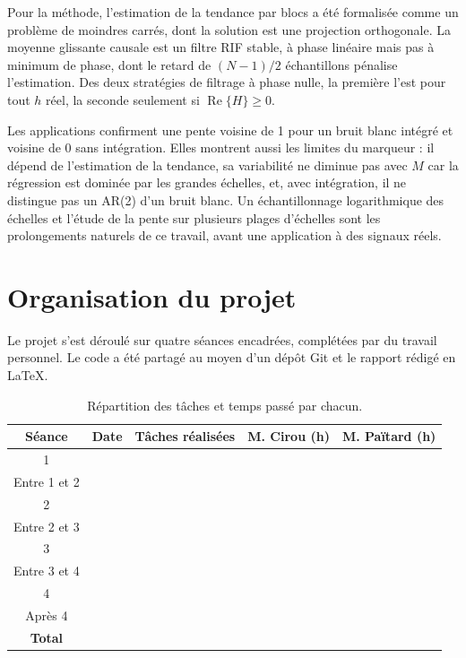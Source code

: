 \documentclass[11pt,a4paper]{article}
\begin{document}
Pour la méthode, l'estimation de la tendance par blocs a été formalisée comme un problème de moindres carrés, dont la solution est une projection orthogonale. La moyenne glissante causale est un filtre RIF stable, à phase linéaire mais pas à minimum de phase, dont le retard de $(N-1)/2$ échantillons pénalise l'estimation. Des deux stratégies de filtrage à phase nulle, la première l'est pour tout $h$ réel, la seconde seulement si $\operatorname{Re}\{H\} \geq 0$.

Les applications confirment une pente voisine de 1 pour un bruit blanc intégré et voisine de 0 sans intégration. Elles montrent aussi les limites du marqueur : il dépend de l'estimation de la tendance, sa variabilité ne diminue pas avec $M$ car la régression est dominée par les grandes échelles, et, avec intégration, il ne distingue pas un AR(2) d'un bruit blanc. Un échantillonnage logarithmique des échelles et l'étude de la pente sur plusieurs plages d'échelles sont les prolongements naturels de ce travail, avant une application à des signaux réels.

\section{Organisation du projet}

Le projet s'est déroulé sur quatre séances encadrées, complétées par du travail personnel. Le code a été partagé au moyen d'un dépôt Git et le rapport rédigé en \LaTeX.

\begin{table}[ht]
  \centering
  \renewcommand{\arraystretch}{1.6}
  \begin{tabular}{|c|c|p{6.2cm}|c|c|}
    \hline
    Séance & Date & Tâches réalisées & M. Cirou (h) & M. Païtard (h) \\
    \hline
    1 & & & & \\
    \hline
    Entre 1 et 2 & & & & \\
    \hline
    2 & & & & \\
    \hline
    Entre 2 et 3 & & & & \\
    \hline
    3 & & & & \\
    \hline
    Entre 3 et 4 & & & & \\
    \hline
    4 & & & & \\
    \hline
    Après 4 & & & & \\
    \hline
    \textbf{Total} & & & & \\
    \hline
  \end{tabular}
  \caption{Répartition des tâches et temps passé par chacun.}
  \label{tab:organisation}
\end{table}
\end{document}
